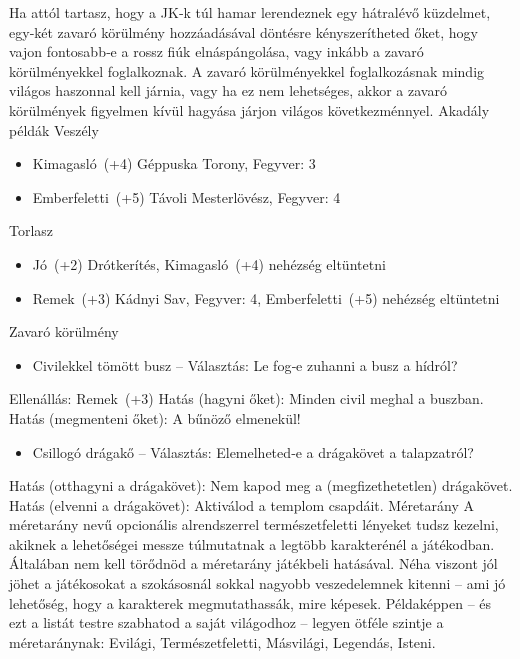 \documentclass[oneside]{book}
\begin{document}
Ha attól tartasz, hogy a JK‑k túl hamar lerendeznek egy hátralévő küzdelmet, egy‑két zavaró körülmény hozzáadásával döntésre kényszerítheted őket, hogy vajon fontosabb‑e a rossz fiúk elnáspángolása, vagy inkább a zavaró körülményekkel foglalkoznak.
A zavaró körülményekkel foglalkozásnak mindig világos haszonnal kell járnia, vagy ha ez nem lehetséges, akkor a zavaró körülmények figyelmen kívül hagyása járjon világos következménnyel.
Akadály példák
Veszély

\begin{itemize}
    \item Kimagasló~(+4) Géppuska Torony, Fegyver: 3
    \item Emberfeletti~(+5) Távoli Mesterlövész, Fegyver: 4
\end{itemize}

Torlasz

\begin{itemize}
    \item Jó~(+2) Drótkerítés, Kimagasló~(+4) nehézség eltüntetni
    \item Remek~(+3) Kádnyi Sav, Fegyver: 4, Emberfeletti~(+5) nehézség eltüntetni
\end{itemize}

Zavaró körülmény

\begin{itemize}
    \item Civilekkel tömött busz – Választás: Le fog‑e zuhanni a busz a hídról?
\end{itemize}

Ellenállás: Remek~(+3)
Hatás (hagyni őket): Minden civil meghal a buszban.
Hatás (megmenteni őket): A bűnöző elmenekül!

\begin{itemize}
    \item Csillogó drágakő – Választás: Elemelheted‑e a drágakövet a talapzatról?
\end{itemize}

Hatás (otthagyni a drágakövet): Nem kapod meg a (megfizethetetlen) drágakövet.
Hatás (elvenni a drágakövet): Aktiválod a templom csapdáit.
Méretarány
A méretarány nevű opcionális alrendszerrel természetfeletti lényeket tudsz kezelni, akiknek a lehetőségei messze túlmutatnak a legtöbb karakterénél a játékodban. Általában nem kell törődnöd a méretarány játékbeli hatásával. Néha viszont jól jöhet a játékosokat a szokásosnál sokkal nagyobb veszedelemnek kitenni – ami jó lehetőség, hogy a karakterek megmutathassák, mire képesek.
Példaképpen – és ezt a listát testre szabhatod a saját világodhoz – legyen ötféle szintje a méretaránynak: Evilági, Természetfeletti, Másvilági, Legendás, Isteni.
\end{document}
